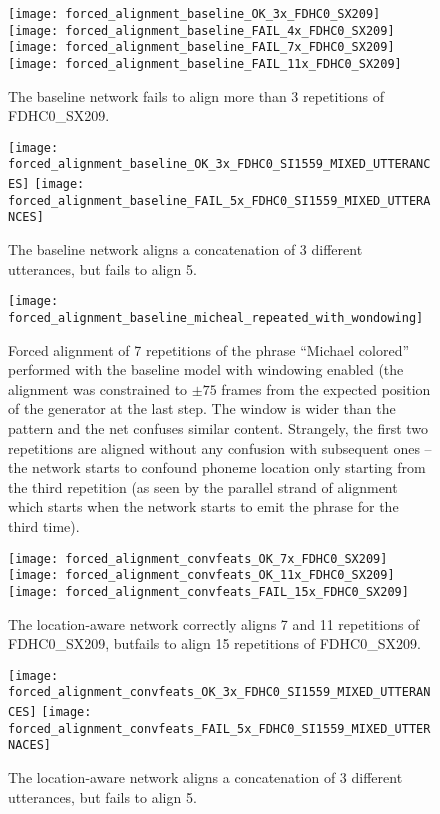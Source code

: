 \begin{sidewaysfigure}[h]
  \texttt{[image: forced\_alignment\_baseline\_OK\_3x\_FDHC0\_SX209]}
  \texttt{[image: forced\_alignment\_baseline\_FAIL\_4x\_FDHC0\_SX209]}
  \texttt{[image: forced\_alignment\_baseline\_FAIL\_7x\_FDHC0\_SX209]}
  \texttt{[image: forced\_alignment\_baseline\_FAIL\_11x\_FDHC0\_SX209]}
  \caption{The baseline network fails to align more than 3 repetitions
    of FDHC0\_SX209.}
\end{sidewaysfigure}

\begin{sidewaysfigure}[h]
  \texttt{[image: forced\_alignment\_baseline\_OK\_3x\_FDHC0\_SI1559\_MIXED\_UTTERANCES]}
  \texttt{[image: forced\_alignment\_baseline\_FAIL\_5x\_FDHC0\_SI1559\_MIXED\_UTTERANCES]}
  \caption{The baseline network aligns a concatenation of 3 different
    utterances, but fails to align 5.}
\end{sidewaysfigure}

\begin{sidewaysfigure}[h]
  \texttt{[image: forced\_alignment\_baseline\_micheal\_repeated\_with\_wondowing]}
  \caption{Forced alignment of 7 repetitions of the phrase ``Michael
    colored'' performed with the baseline model with windowing enabled
  (the alignment was constrained to $\pm 75$ frames from the expected
  position of the generator at the last step. The window is wider than
the pattern and the net confuses similar content. Strangely, the first
two repetitions are aligned without any confusion with subsequent ones --
the network starts to confound phoneme location only starting from the
third repetition (as seen by the parallel strand of alignment which
starts when the network starts to emit the phrase for the third time).
}
\end{sidewaysfigure}


\begin{sidewaysfigure}[h]
  \texttt{[image: forced\_alignment\_convfeats\_OK\_7x\_FDHC0\_SX209]}
  \texttt{[image: forced\_alignment\_convfeats\_OK\_11x\_FDHC0\_SX209]}
  \texttt{[image: forced\_alignment\_convfeats\_FAIL\_15x\_FDHC0\_SX209]}
  \caption{The location-aware network correctly aligns 7 and 11
    repetitions of FDHC0\_SX209, butfails to align 15 repetitions
    of FDHC0\_SX209.}
\end{sidewaysfigure}

\begin{sidewaysfigure}[h]
  \texttt{[image: forced\_alignment\_convfeats\_OK\_3x\_FDHC0\_SI1559\_MIXED\_UTTERANCES]}
  \texttt{[image: forced\_alignment\_convfeats\_FAIL\_5x\_FDHC0\_SI1559\_MIXED\_UTTERNACES]}
  \caption{The location-aware network aligns a concatenation of 3 different
    utterances, but fails to align 5.}
\end{sidewaysfigure}

